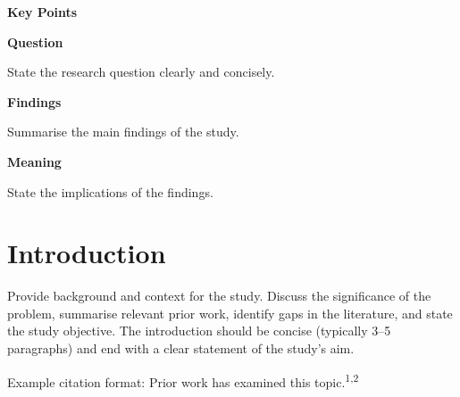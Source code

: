 \documentclass[10pt, letterpaper]{article}
\begin{document}
\hfill
\begin{minipage}[t]{0.33\textwidth}
\begin{mdframed}[style=keypointsbox]
{\sffamily\bfseries\fontsize{10}{12}\selectfont\color{jamacrimson}
Key Points\par}
\vspace{4pt}

{\sffamily\bfseries\fontsize{8.5}{10.5}\selectfont Question\enspace}%
{\fontsize{8.5}{10.5}\selectfont
State the research question clearly and concisely.\par}

\vspace{6pt}

{\sffamily\bfseries\fontsize{8.5}{10.5}\selectfont Findings\enspace}%
{\fontsize{8.5}{10.5}\selectfont
Summarise the main findings of the study.\par}

\vspace{6pt}

{\sffamily\bfseries\fontsize{8.5}{10.5}\selectfont Meaning\enspace}%
{\fontsize{8.5}{10.5}\selectfont
State the implications of the findings.\par}
\end{mdframed}



\end{minipage}

\newpage

\section*{Introduction}

Provide background and context for the study. Discuss the significance of the
problem, summarise relevant prior work, identify gaps in the literature, and
state the study objective. The introduction should be concise (typically 3--5
paragraphs) and end with a clear statement of the study's aim.

Example citation format: Prior work has examined this
topic.\textsuperscript{1,2}


\end{document}
